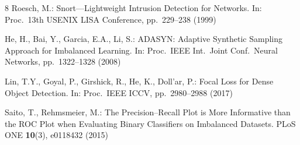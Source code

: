 \documentclass[runningheads]{llncs}
\begin{document}
\begin{thebibliography}{8}
Roesch, M.: Snort---Lightweight Intrusion Detection for Networks. In: Proc.\ 13th USENIX LISA Conference, pp.\ 229--238 (1999)

He, H., Bai, Y., Garcia, E.A., Li, S.: ADASYN: Adaptive Synthetic Sampling Approach for Imbalanced Learning. In: Proc.\ IEEE Int.\ Joint Conf.\ Neural Networks, pp.\ 1322--1328 (2008)

Lin, T.Y., Goyal, P., Girshick, R., He, K., Doll'{a}r, P.: Focal Loss for Dense Object Detection. In: Proc.\ IEEE ICCV, pp.\ 2980--2988 (2017)

Saito, T., Rehmsmeier, M.: The Precision--Recall Plot is More Informative than the ROC Plot when Evaluating Binary Classifiers on Imbalanced Datasets. PLoS ONE \textbf{10}(3), e0118432 (2015)

\end{thebibliography}
\end{document}
